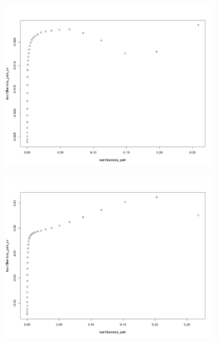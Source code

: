 \documentclass[letterpaper]{article}
\begin{document}
\begin{figure}[H]
\centering
\begin{subfigure}{0.5\textwidth}
  \centering
  \includegraphics[width=1\linewidth]{./result_plot/correct/1_path_plot}
\end{subfigure}%
\begin{subfigure}{.5\textwidth}
  \centering
  \includegraphics[width=1\linewidth]{./result_plot/correct/2_path_plot}
\end{subfigure}
\end{figure}
\end{document}
